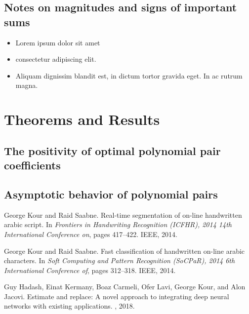 \documentclass{article}
\theoremstyle{definition}
\theoremstyle{remark}
\numberwithin{equation}{section}
\begin{document}
\subsection{Notes on magnitudes and signs of important sums}
\begin{itemize}
\item Lorem ipsum dolor sit amet
\item consectetur adipiscing elit. 
\item Aliquam dignissim blandit est, in dictum tortor gravida eget. In ac rutrum magna.
\end{itemize}

\section{Theorems and Results}
\subsection{The positivity of optimal polynomial pair coefficients}

\subsection{Asymptotic behavior of polynomial pairs}
  


\begin{thebibliography}{1}

George Kour and Raid Saabne.
\newblock Real-time segmentation of on-line handwritten arabic script.
\newblock In {\em Frontiers in Handwriting Recognition (ICFHR), 2014 14th
  International Conference on}, pages 417--422. IEEE, 2014.

George Kour and Raid Saabne.
\newblock Fast classification of handwritten on-line arabic characters.
\newblock In {\em Soft Computing and Pattern Recognition (SoCPaR), 2014 6th
  International Conference of}, pages 312--318. IEEE, 2014.

Guy Hadash, Einat Kermany, Boaz Carmeli, Ofer Lavi, George Kour, and Alon
  Jacovi.
\newblock Estimate and replace: A novel approach to integrating deep neural
  networks with existing applications.
, 2018.

\end{thebibliography}
\end{document}
